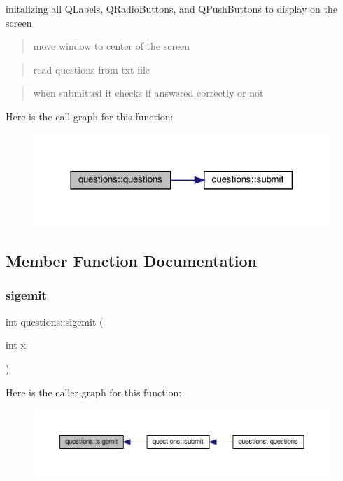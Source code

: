 initalizing all Q\+Labels, Q\+Radio\+Buttons, and Q\+Push\+Buttons to display on the screen

\begin{quote}
move window to center of the screen \end{quote}


\begin{quote}
read questions from txt file \end{quote}


\begin{quote}
when submitted it checks if answered correctly or not \end{quote}
Here is the call graph for this function\+:
\nopagebreak
\begin{figure}[H]
\begin{center}
\leavevmode
\includegraphics[width=317pt]{classquestions_ada6384e6cce19d918f03901087785108_cgraph}
\end{center}
\end{figure}


\subsection{Member Function Documentation}
\mbox{\label{classquestions_a57897ef434896420d9c838d2049eb537}} 
\subsubsection{\texorpdfstring{sigemit}{sigemit}}
{\footnotesize\ttfamily int questions\+::sigemit (\begin{DoxyParamCaption}\item[{int}]{x }\end{DoxyParamCaption})\hspace{0.3cm}{\ttfamily [signal]}}

Here is the caller graph for this function\+:
\nopagebreak
\begin{figure}[H]
\begin{center}
\leavevmode
\includegraphics[width=350pt]{classquestions_a57897ef434896420d9c838d2049eb537_icgraph}
\end{center}
\end{figure}
\mbox{\label{classquestions_a6425653b765e9a7bf937907c32b15e4b}} 
